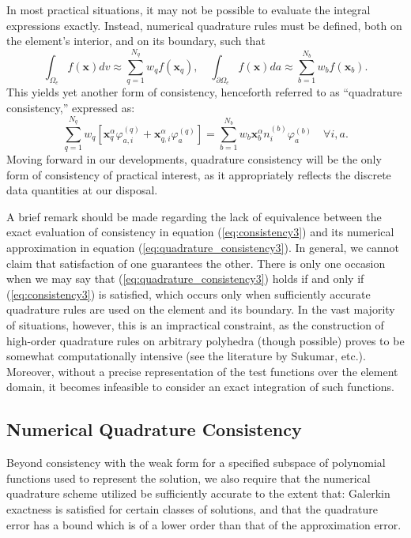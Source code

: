 In most practical situations, it may not be possible to evaluate the integral expressions exactly. Instead, numerical quadrature rules must be defined, both on the element's interior, and on its boundary, such that
\begin{equation}
  \int_{\Omega_e} f(\mathbf{x}) dv \approx \sum_{q=1}^{N_q} w_q f(\mathbf{x}_q), \quad \int_{\partial \Omega_e} f(\mathbf{x}) da \approx \sum_{b=1}^{N_b} w_b f(\mathbf{x}_b).
\end{equation}
This yields yet another form of consistency, henceforth referred to as ``quadrature consistency,'' expressed as:
\begin{equation}
  \sum_{q=1}^{N_q} w_q \left[ \mathbf{x}_q^{\alpha} \varphi^{(q)}_{a,i} + \mathbf{x}^{\alpha}_{q,i} \varphi^{(q)}_a \right] = \sum_{b=1}^{N_b} w_b \mathbf{x}_b^{\alpha} n^{(b)}_i \varphi^{(b)}_a \quad \forall i, a.
  \label{eq:quadrature_consistency3}
\end{equation}
Moving forward in our developments, quadrature consistency will be the only form of consistency of practical interest, as it appropriately reflects the discrete data quantities at our disposal.

A brief remark should be made regarding the lack of equivalence between the exact evaluation of consistency in equation (\ref{eq:consistency3}) and its numerical approximation in equation (\ref{eq:quadrature_consistency3}). In general, we cannot claim that satisfaction of one guarantees the other. There is only one occasion when we may say that (\ref{eq:quadrature_consistency3}) holds if and only if (\ref{eq:consistency3}) is satisfied, which occurs only when sufficiently accurate quadrature rules are used on the element and its boundary. In the vast majority of situations, however, this is an impractical constraint, as the construction of high-order quadrature rules on arbitrary polyhedra (though possible) proves to be somewhat computationally intensive (see the literature by Sukumar, etc.). Moreover, without a precise representation of the test functions over the element domain, it becomes infeasible to consider an exact integration of such functions.

\subsection*{Numerical Quadrature Consistency}

Beyond consistency with the weak form for a specified subspace of polynomial functions used to represent the solution, we also require that the numerical quadrature scheme utilized be sufficiently accurate to the extent that: Galerkin exactness is satisfied for certain classes of solutions, and that the quadrature error has a bound which is of a lower order than that of the approximation error.

